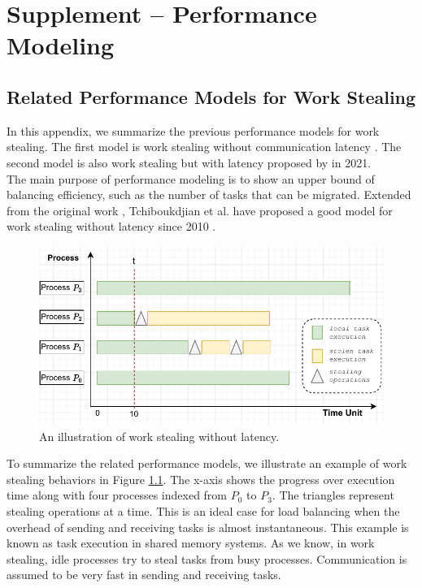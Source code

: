 \chapter{Supplement -- Performance Modeling}
\label{App_A:Perf_Model}
\chaptertoc

\section{Related Performance Models for Work Stealing}
\label{App_A:related_models_workstealing}

In this appendix, we summarize the previous performance models for work stealing. The first model is work stealing without communication latency \cite{tchiboukdjian2010tighter} \cite{tchiboukdjian2013decentralized}. The second model is also work stealing but with latency proposed by \cite{gast2021analysis} in 2021.\\

The main purpose of performance modeling is to show an upper bound of balancing efficiency, such as the number of tasks that can be migrated. Extended from the original work \cite{Blumofe1999OriginWS}, Tchiboukdjian et al. have proposed a good model for work stealing without latency since 2010 \cite{tchiboukdjian2010tighter} \cite{tchiboukdjian2013decentralized}.\\

\begin{figure}[t]
  \centering
  \includegraphics[scale=0.8]{./pictures/perf_analysis_model/perf_analysis_related_model_without_latency.pdf}
	\caption{An illustration of work stealing without latency.}
	\label{fig:perfmodel_relatedmodelwithoutlatency}
\end{figure}

To summarize the related performance models, we illustrate an example of work stealing behaviors in Figure \ref{fig:perfmodel_relatedmodelwithoutlatency}. The x-axis shows the progress over execution time along with four processes indexed from $P_{0}$ to $P_{3}$. The triangles represent stealing operations at a time. This is an ideal case for load balancing when the overhead of sending and receiving tasks is almost instantaneous. This example is known as task execution in shared memory systems. As we know, in work stealing, idle processes try to steal tasks from busy processes. Communication is assumed to be very fast in sending and receiving tasks.\\

